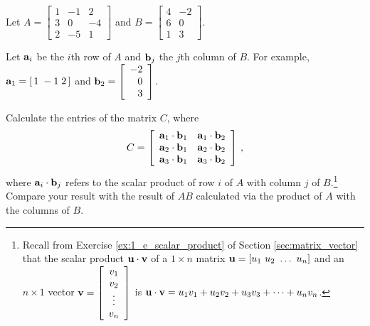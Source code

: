 \begin{activity} \label{act:A2.1_3} Let $A = \left[ \begin{array}{crr} 1&-1&2 \\ 3&0&-4 \\ 2&-5&1 \end{array} \right]$ and $B = \left[ \begin{array}{cr} 4&-2 \\ 6&0 \\ 1&3 \end{array} \right]$. 

Let $\mathbf{a}_i$ be the $i$th row of $A$ and $\mathbf{b}_j$ the $j$th column of $B$. For example, $\mathbf{a}_1=[ \, 1 \; -1 \; 2 \, ]$ and $\mathbf{b}_2 = \left[ \begin{array}{r} -2 \\ 0 \\ 3 \end{array} \right]$. 

Calculate the entries of the matrix $C$, where 
\[C = \left[ \begin{array}{cc} \mathbf{a}_1 \cdot \mathbf{b}_1 & \mathbf{a}_1 \cdot \mathbf{b}_2 \\ \mathbf{a}_2 \cdot \mathbf{b}_1 & \mathbf{a}_2 \cdot \mathbf{b}_2 \\ \mathbf{a}_3 \cdot \mathbf{b}_1 & \mathbf{a}_3 \cdot \mathbf{b}_2 \end{array} \right]\,, \]
where $\mathbf{a}_i \cdot \mathbf{b}_j$ refers to the scalar product of row $i$ of $A$ with column $j$ of $B$.\footnote{Recall from Exercise \ref{ex:1_e_scalar_product} of Section \ref{sec:matrix_vector} that the scalar product $\mathbf{u} \cdot \mathbf{v}$ of a $1 \times n$ matrix $\vu = [u_1 \ u_2 \ \ldots \ u_n]$ and an $n \times 1$ vector $\mathbf{v}=\left[ \begin{array}{c} v_1\\ v_2\\ \vdots \\ v_n \end{array} \right]$ is $\mathbf{u} \cdot \mathbf{v} = u_1v_1 + u_2v_2 + u_3v_3 + \cdots + u_nv_n$.} Compare your result with the result of $AB$ calculated via the product of $A$ with the columns of $B$.



\end{activity}





